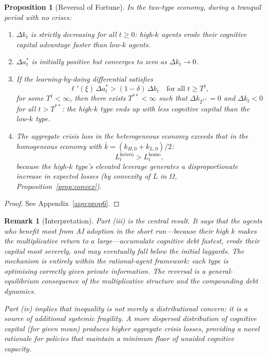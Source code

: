 \documentclass[12pt]{article}
\newtheorem{proposition}{Proposition}
\newtheorem{remark}{Remark}
\begin{document}
\begin{proposition}[Reversal of Fortune]
\label{prop:hetero}
In the two-type economy, during a tranquil period with no crises:
\begin{enumerate}
\item[\emph{(i)}] $\Delta k_t$ is strictly decreasing for all $t \geq 0$:
high-$k$ agents erode their cognitive capital advantage faster than low-$k$ agents.
\item[\emph{(ii)}] $\Delta a_t^*$ is initially positive but converges to zero as
$\Delta k_t \to 0$.
\item[\emph{(iii)}] If the learning-by-doing differential satisfies
\begin{equation}
\ell'(\xi)\,\Delta a_t^* > (1-\delta)\,\Delta k_t
\quad \text{for all } t \geq T^\dagger,
\label{eq:reversal_condition}
\end{equation}
for some $T^\dagger < \infty$, then there exists $T^{**} < \infty$ such that
$\Delta k_{T^{**}} = 0$ and $\Delta k_t < 0$ for all $t > T^{**}$:
\emph{the high-$k$ type ends up with less cognitive capital than the low-$k$ type.}
\item[\emph{(iv)}] The aggregate crisis loss in the heterogeneous economy exceeds
that in the homogeneous economy with $\bar k = (k_{H,0} + k_{L,0})/2$:
\[
L_t^{\text{hetero}} > L_t^{\text{homo}},
\]
because the high-$k$ type's elevated leverage generates a disproportionate increase
in expected losses (by convexity of $L$ in $\Omega$, Proposition~\ref{prop:convex}).
\end{enumerate}
\end{proposition}

\begin{proof}
See Appendix~\ref{app:prop6}.
\end{proof}

\begin{remark}[Interpretation]
Part (iii) is the central result. It says that the agents who benefit \emph{most}
from AI adoption in the short run---because their high $k$ makes the multiplicative
return to $a$ large---accumulate cognitive debt fastest, erode their capital most
severely, and may eventually fall below the initial laggards. The mechanism is
entirely within the rational-agent framework: each type is optimising correctly
given private information. The reversal is a general-equilibrium consequence of
the multiplicative structure and the compounding debt dynamics.

Part (iv) implies that inequality is not merely a distributional concern: it is a
source of additional systemic fragility. A more dispersed distribution of cognitive
capital (for given mean) produces higher aggregate crisis losses, providing a
novel rationale for policies that maintain a minimum floor of unaided cognitive
capacity.
\end{remark}
\end{document}

